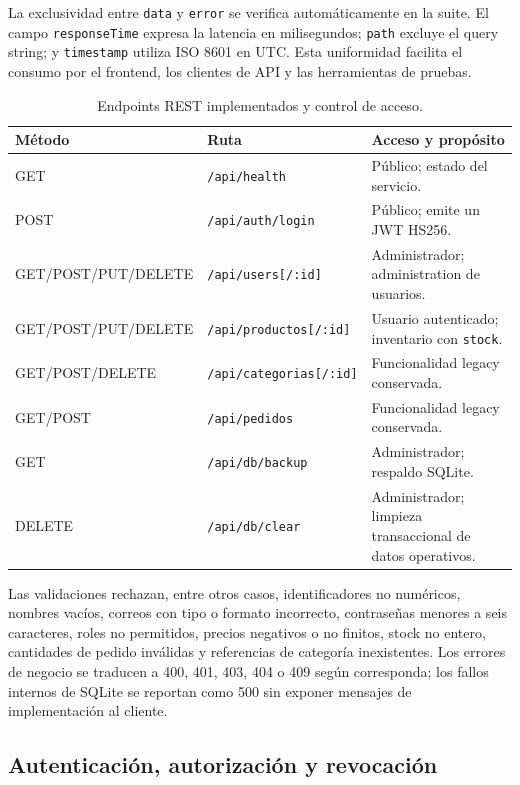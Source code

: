 \documentclass[12pt,a4paper]{article}
\begin{document}
La exclusividad entre \texttt{data} y \texttt{error} se verifica automáticamente en la suite. El campo \texttt{responseTime} expresa la latencia en milisegundos; \texttt{path} excluye el query string; y \texttt{timestamp} utiliza ISO 8601 en UTC. Esta uniformidad facilita el consumo por el frontend, los clientes de API y las herramientas de pruebas.

\begin{table}[H]
  \centering
  \caption{Endpoints REST implementados y control de acceso.}
  \small
  \begin{tabularx}{\textwidth}{l l >{\raggedright\arraybackslash}X}
    \toprule
    Método & Ruta & Acceso y propósito \\
    \midrule
    GET & \texttt{/api/health} & Público; estado del servicio. \\
    POST & \texttt{/api/auth/login} & Público; emite un JWT HS256. \\
    GET/POST/PUT/DELETE & \texttt{/api/users[/:id]} & Administrador; administration de usuarios. \\
    GET/POST/PUT/DELETE & \texttt{/api/productos[/:id]} & Usuario autenticado; inventario con \texttt{stock}. \\
    GET/POST/DELETE & \texttt{/api/categorias[/:id]} & Funcionalidad legacy conservada. \\
    GET/POST & \texttt{/api/pedidos} & Funcionalidad legacy conservada. \\
    GET & \texttt{/api/db/backup} & Administrador; respaldo SQLite. \\
    DELETE & \texttt{/api/db/clear} & Administrador; limpieza transaccional de datos operativos. \\
    \bottomrule
  \end{tabularx}
\end{table}

Las validaciones rechazan, entre otros casos, identificadores no numéricos, nombres vacíos, correos con tipo o formato incorrecto, contraseñas menores a seis caracteres, roles no permitidos, precios negativos o no finitos, stock no entero, cantidades de pedido inválidas y referencias de categoría inexistentes. Los errores de negocio se traducen a 400, 401, 403, 404 o 409 según corresponda; los fallos internos de SQLite se reportan como 500 sin exponer mensajes de implementación al cliente.

\subsection{Autenticación, autorización y revocación}
\end{document}

